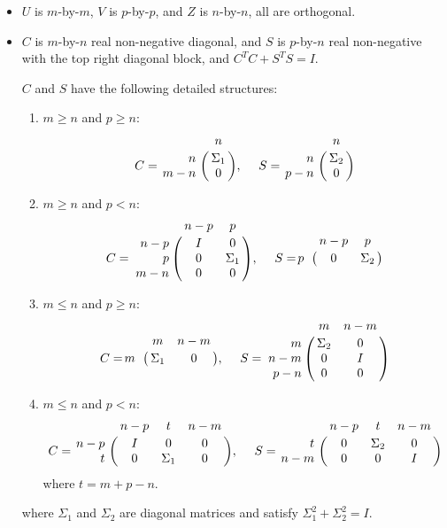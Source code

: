     \begin{itemize}
        \item $U$ is $m$-by-$m$, $V$ is $p$-by-$p$, 
             and $Z$ is $n$-by-$n$, all are orthogonal. 
        \item $C$ is $m$-by-$n$ real non-negative diagonal,
              and $S$ is $p$-by-$n$ real non-negative with 
                  the top right diagonal block, and 
        $C^{T}C + S^{T}S = I$. 


$C$ and $S$ have the following detailed structures: 
\begin{enumerate}
        \item $m \geq n$ and $p \geq n$:
        \begin{displaymath}
            C = \bordermatrix{ & n  \cr
            \hfill n & \Sigma_1 \cr
            \hfill m-n & 0}, \  \ \ \
            S = \bordermatrix{ & n \cr
            \hfill n & \Sigma_2 \cr
            \hfill p-n & 0}
        \end{displaymath}
        
        \item $m \geq n$ and $p < n$:
        \begin{displaymath}
            C = \bordermatrix{ & n-p & p  \cr
            \hfill n-p & I & 0 \cr
            \hfill p & 0 & \Sigma_1 \cr
            \hfill m-n & 0 & 0}, \  \ \ \
            S = \bordermatrix{ & n-p & p\cr
            \hfill p & 0 & \Sigma_2}
        \end{displaymath}
        
        \item $m \leq n$ and $p \geq n$:
        \begin{displaymath}
            C = \bordermatrix{ & m & n-m\cr
            \hfill m & \Sigma_1 & 0}, \  \ \ \
            S = \bordermatrix{ & m & n-m  \cr
            \hfill m & \Sigma_2 & 0 \cr
            \hfill n-m & 0 & I \cr
            \hfill p-n & 0 & 0}
        \end{displaymath}
        
        \item $m \leq n$ and $p < n$:
        \begin{displaymath}
            C = \bordermatrix{ & n-p & t & n-m \cr
            \hfill n-p & I & 0 & 0 \cr
            \hfill t & 0 & \Sigma_1 & 0}, \  \ \ \
            S = \bordermatrix{ & n-p & t & n-m \cr
            \hfill t & 0 & \Sigma_2 & 0 \cr
            \hfill n-m & 0 & 0 & I}
        \end{displaymath}
        where $t = m+p-n$.
    \end{enumerate}
where $\Sigma_1$ and $\Sigma_2$ are diagonal matrices 
and satisfy $\Sigma_1^2 + \Sigma_2^2 = I$.
\end{itemize} 

